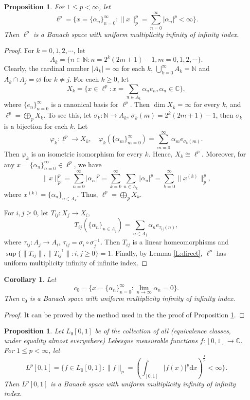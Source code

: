 \documentclass[12pt]{amsart}
\numberwithin{equation}{section}
\theoremstyle{plain}
\newtheorem{cor}[thm]{Corollary}
\newtheorem{prop}[thm]{Proposition}
\theoremstyle{definition}
\newcommand{\bC}{{\mathbb{C}}}
\newcommand{\bN}{{\mathbb{N}}}
\renewcommand{\phi}{\varphi}
\begin{document}
\begin{prop}\label{B:lp}
For $1\leq p<\infty$, let
$$\ell^p=\{x=\{\alpha_n\}_{n=0}^{\infty}:\|x\|_p^p=\sum_{n=0}^{\infty}|\alpha_n|^p<\infty\}.$$
Then $\ell^p$ is a Banach space with uniform multiplicity infinity of infinity index.
\end{prop}
\begin{proof}
For $k=0,1,2,\cdots$, let
$$A_k=\{n\in \mathbb{N}:n=2^k(2m+1)-1,m=0,1,2,\cdots\}.$$
Clearly, the cardinal number $|A_k|=\infty$ for each $k$,  $\bigcup_{k=0}^{\infty} A_k=\bN$ and $A_k \cap A_j=\varnothing$ for $k\neq j$.
For each $k\geq 0$, let
$$X_k=\{x\in\ell^p:x=\sum_{n\in A_k}\alpha_ne_n,\alpha_n\in\bC\},$$
where $\{e_n\}_{n=0}^{\infty}$ is a canonical basis for $\ell^p$.
Then $\dim X_k=\infty$ for every $k$, and $\ell^p=\bigoplus_{p}X_k$.
To see this, let $\sigma_k:\bN\rightarrow A_k$, $\sigma_k(m)=2^k(2m+1)-1$,
then $\sigma_k$ is a bijection for each $k$.
Let
$$\phi_k:\ell^p\rightarrow X_k,\quad \phi_k(\{\alpha_m\}_{m=0}^{\infty})=\sum_{m=0}^{\infty}\alpha_me_{\sigma_k(m)}.$$
Then $\phi_k$ is an isometric isomorphism for every $k$.
Hence, $X_k\cong \ell^p$.
Moreover, for any $x=\{\alpha_n\}_{n=0}^{\infty}\in\ell^p$, we have
$$\|x\|_p^p=\sum_{n=0}^{\infty}|\alpha_n|^p=\sum_{k=0}^{\infty}\sum_{n\in A_k}|\alpha_n|^p=\sum_{k=0}^{\infty}\|x^{(k)}\|_p^p,$$
where $x^{(k)}=\{\alpha_n\}_{n\in A_k}$. Thus, $\ell^p=\bigoplus_{p}X_k$.

For $i,j\geq 0$, let $T_{ij}:X_j\rightarrow X_i$,
$$T_{ij}(\{\alpha_n\}_{n\in A_j})=\sum_{n\in A_j}\alpha_n e_{\tau_{ij}(n)},$$
where $\tau_{ij}:A_j\rightarrow A_i$, $\tau_{ij}=\sigma_i\circ\sigma_j^{-1}$.
Then
$T_{ij}$ is a linear homeomorphisms and $\sup\{\|T_{ij}\|,\|T_{ij}^{-1}\|:i,j\geq 0\}=1$.
Finally,
by Lemma \ref{L:direct}, $\ell^p$ has uniform multiplicity infinity of infinite index.
\end{proof}

\begin{cor}
Let
$$c_0=\{x=\{\alpha_n\}_{n=0}^{\infty}:\lim_{n\rightarrow\infty}\alpha_n=0\}.$$
Then $c_0$ is a Banach space with uniform multiplicity infinity of infinity index.
\end{cor}
\begin{proof}
It can be proved by the method used in the the proof of Proposition \ref{B:lp}.
\end{proof}

\begin{prop}
Let $L_0[0,1]$ be of the collection of all (equivalence classes, under equality almost everywhere) Lebesgue measurable functions $f:[0,1]\rightarrow \mathbb{C}$.
For $1\leq p<\infty$, let
$$L^p[0,1]=\{f\in L_0[0,1]:\|f\|_p=\left(\int_{[0,1]}|f(x)|^p \mathrm{d}x\right)^{\frac{1}{p}}<\infty\}.$$
Then $L^p[0,1]$ is a Banach space with uniform multiplicity infinity of infinity index.
\end{prop}
\end{document}
